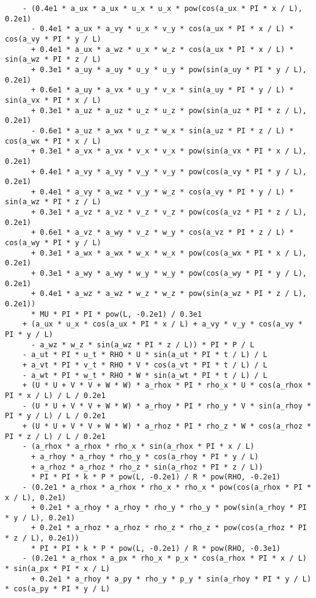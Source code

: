 \documentclass[10pt]{article}
\begin{document}
\begin{small}
\begin{verbatim}
    - (0.4e1 * a_ux * a_ux * u_x * u_x * pow(cos(a_ux * PI * x / L), 0.2e1)
      - 0.4e1 * a_ux * a_vy * u_x * v_y * cos(a_ux * PI * x / L) * cos(a_vy * PI * y / L)
      + 0.4e1 * a_ux * a_wz * u_x * w_z * cos(a_ux * PI * x / L) * sin(a_wz * PI * z / L)
      + 0.3e1 * a_uy * a_uy * u_y * u_y * pow(sin(a_uy * PI * y / L), 0.2e1)
      + 0.6e1 * a_uy * a_vx * u_y * v_x * sin(a_uy * PI * y / L) * sin(a_vx * PI * x / L)
      + 0.3e1 * a_uz * a_uz * u_z * u_z * pow(sin(a_uz * PI * z / L), 0.2e1)
      - 0.6e1 * a_uz * a_wx * u_z * w_x * sin(a_uz * PI * z / L) * cos(a_wx * PI * x / L)
      + 0.3e1 * a_vx * a_vx * v_x * v_x * pow(sin(a_vx * PI * x / L), 0.2e1)
      + 0.4e1 * a_vy * a_vy * v_y * v_y * pow(cos(a_vy * PI * y / L), 0.2e1)
      + 0.4e1 * a_vy * a_wz * v_y * w_z * cos(a_vy * PI * y / L) * sin(a_wz * PI * z / L)
      + 0.3e1 * a_vz * a_vz * v_z * v_z * pow(cos(a_vz * PI * z / L), 0.2e1)
      + 0.6e1 * a_vz * a_wy * v_z * w_y * cos(a_vz * PI * z / L) * cos(a_wy * PI * y / L)
      + 0.3e1 * a_wx * a_wx * w_x * w_x * pow(cos(a_wx * PI * x / L), 0.2e1)
      + 0.3e1 * a_wy * a_wy * w_y * w_y * pow(cos(a_wy * PI * y / L), 0.2e1)
      + 0.4e1 * a_wz * a_wz * w_z * w_z * pow(sin(a_wz * PI * z / L), 0.2e1))
      * MU * PI * PI * pow(L, -0.2e1) / 0.3e1
    + (a_ux * u_x * cos(a_ux * PI * x / L) + a_vy * v_y * cos(a_vy * PI * y / L)
      - a_wz * w_z * sin(a_wz * PI * z / L)) * PI * P / L
    - a_ut * PI * u_t * RHO * U * sin(a_ut * PI * t / L) / L
    + a_vt * PI * v_t * RHO * V * cos(a_vt * PI * t / L) / L
    - a_wt * PI * w_t * RHO * W * sin(a_wt * PI * t / L) / L
    + (U * U + V * V + W * W) * a_rhox * PI * rho_x * U * cos(a_rhox * PI * x / L) / L / 0.2e1
    - (U * U + V * V + W * W) * a_rhoy * PI * rho_y * V * sin(a_rhoy * PI * y / L) / L / 0.2e1
    + (U * U + V * V + W * W) * a_rhoz * PI * rho_z * W * cos(a_rhoz * PI * z / L) / L / 0.2e1
    - (a_rhox * a_rhox * rho_x * sin(a_rhox * PI * x / L)
      + a_rhoy * a_rhoy * rho_y * cos(a_rhoy * PI * y / L)
      + a_rhoz * a_rhoz * rho_z * sin(a_rhoz * PI * z / L))
      * PI * PI * k * P * pow(L, -0.2e1) / R * pow(RHO, -0.2e1)
    - (0.2e1 * a_rhox * a_rhox * rho_x * rho_x * pow(cos(a_rhox * PI * x / L), 0.2e1)
      + 0.2e1 * a_rhoy * a_rhoy * rho_y * rho_y * pow(sin(a_rhoy * PI * y / L), 0.2e1)
      + 0.2e1 * a_rhoz * a_rhoz * rho_z * rho_z * pow(cos(a_rhoz * PI * z / L), 0.2e1))
      * PI * PI * k * P * pow(L, -0.2e1) / R * pow(RHO, -0.3e1)
    - (0.2e1 * a_rhox * a_px * rho_x * p_x * cos(a_rhox * PI * x / L) * sin(a_px * PI * x / L)
      + 0.2e1 * a_rhoy * a_py * rho_y * p_y * sin(a_rhoy * PI * y / L) * cos(a_py * PI * y / L)

\end{verbatim}
\end{small}
\end{document}
